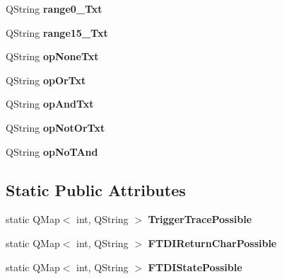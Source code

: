\begin{DoxyCompactItemize}
\mbox{\label{class_global_enumated_and_extern_af1c7900c3aa9912be038cbba1b8c2b58}} 
Q\+String {\bfseries range0\+\_\+Txt}
\item 
\mbox{\label{class_global_enumated_and_extern_a16bd134d1864f480d7d5f48ffa5afe9d}} 
Q\+String {\bfseries range15\+\_\+Txt}
\item 
\mbox{\label{class_global_enumated_and_extern_af22bf56c5e5919e4d8015d58162534ea}} 
Q\+String {\bfseries op\+None\+Txt}
\item 
\mbox{\label{class_global_enumated_and_extern_a0eaa8293b1f94e652d022f3431a6a840}} 
Q\+String {\bfseries op\+Or\+Txt}
\item 
\mbox{\label{class_global_enumated_and_extern_a187e9b46265c3b1c817e36bbb661705c}} 
Q\+String {\bfseries op\+And\+Txt}
\item 
\mbox{\label{class_global_enumated_and_extern_a56c5d6220c7099ff21a570b8534eb99a}} 
Q\+String {\bfseries op\+Not\+Or\+Txt}
\item 
\mbox{\label{class_global_enumated_and_extern_a0da3df83132ecd4bd1a8021f9ef93628}} 
Q\+String {\bfseries op\+No\+T\+And}
\end{DoxyCompactItemize}
\subsection*{Static Public Attributes}
\begin{DoxyCompactItemize}
\item 
\mbox{\label{class_global_enumated_and_extern_a1f9efd6c1b2c316e8dae8a8d42aaa416}} 
static Q\+Map$<$ int, Q\+String $>$ {\bfseries Trigger\+Trace\+Possible}
\item 
\mbox{\label{class_global_enumated_and_extern_a147de86b95d1ee3efb121901bc43c67a}} 
static Q\+Map$<$ int, Q\+String $>$ {\bfseries F\+T\+D\+I\+Return\+Char\+Possible}
\item 
\mbox{\label{class_global_enumated_and_extern_aeae501d34ab48ca2647ba68bc94d59fd}} 
static Q\+Map$<$ int, Q\+String $>$ {\bfseries F\+T\+D\+I\+State\+Possible}
\end{DoxyCompactItemize}



